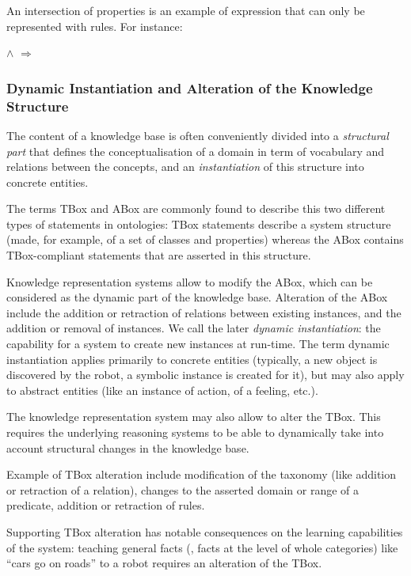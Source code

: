 An intersection of properties is an example of expression that can only be
represented with rules. For instance:

\footnotesize
{} $\land$ 
$\Rightarrow$ 
\normalsize

\subsubsection{Dynamic Instantiation and Alteration of the Knowledge Structure}

The content of a knowledge base is often conveniently divided into a
\emph{structural part} that defines the conceptualisation of a domain in term
of vocabulary and relations between the concepts, and an \emph{instantiation} of
this structure into concrete entities.

The terms TBox and ABox are commonly found to describe this two different types
of statements in ontologies: TBox statements describe a system structure (made,
for example, of a set of classes and properties) whereas the ABox contains
TBox-compliant statements that are asserted in this structure.

Knowledge representation systems allow to modify the ABox, which can be
considered as the dynamic part of the knowledge base. Alteration of the ABox
include the addition or retraction of relations between existing instances,
and the addition or removal of instances. We call the later \emph{dynamic
instantiation}: the capability for a system to create new instances at
run-time. The term dynamic instantiation applies primarily to concrete entities
(typically, a new object is discovered by the robot, a symbolic instance is
created for it), but may also apply to abstract entities (like an instance of
action, of a feeling, etc.).

The knowledge representation system may also allow to alter the TBox. This
requires the underlying reasoning systems to be able to dynamically take into
account structural changes in the knowledge base.

Example of TBox alteration include modification of the taxonomy (like addition
or retraction of a  relation), changes to the asserted
domain or range of a predicate, addition or retraction of rules.

Supporting TBox alteration has notable consequences on the learning
capabilities of the system: teaching general facts (\ie, facts at the level of
whole categories) like ``cars go on roads'' to a robot requires an alteration
of the TBox.

